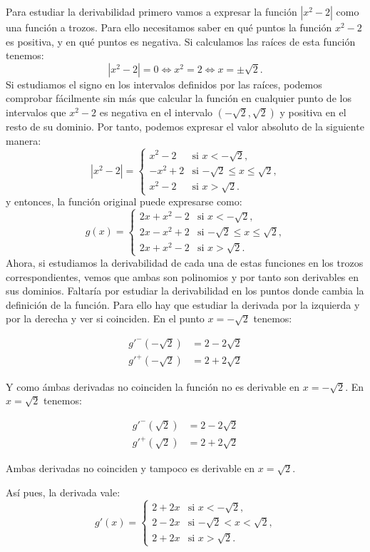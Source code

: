 {Para estudiar la derivabilidad primero vamos a expresar la función $|x^2-2|$ como una función a trozos. Para ello necesitamos saber en qué puntos la función $x^2-2$ es positiva, y en qué puntos es negativa. Si calculamos las raíces de esta función tenemos:
\[
|x^2-2| = 0 \Leftrightarrow x^2 = 2 \Leftrightarrow x = \pm \sqrt 2.
\]
Si estudiamos el signo en los intervalos definidos por las raíces, podemos comprobar fácilmente sin más que calcular la función en cualquier punto de los intervalos que $x^2-2$ es negativa en el intervalo $(-\sqrt 2, \sqrt 2)$ y positiva en el resto de su dominio.
Por tanto, podemos expresar el valor absoluto de la siguiente manera:
\[
|x^2-2| =
\begin{cases}
x^2-2 & \mbox{si $x< -\sqrt{2}$,} \\
-x^2+2 & \mbox{si $-\sqrt 2 \leq x \leq \sqrt 2$,}\\
x^2-2 & \mbox{si $x > \sqrt 2$.}
\end{cases}
\]
y entonces, la función original puede expresarse como:
\[
g(x) =
\begin{cases}
2x+x^2-2 & \mbox{si $x< -\sqrt{2}$,} \\
2x-x^2+2 & \mbox{si $-\sqrt 2 \leq x \leq \sqrt 2$,}\\
2x+x^2-2 & \mbox{si $x > \sqrt 2$.}
\end{cases}
\]
Ahora, si estudiamos la derivabilidad de cada una de estas funciones en los trozos correspondientes, vemos que ambas son polinomios y por tanto son derivables en sus dominios. Faltaría por estudiar la derivabilidad en los puntos donde cambia la definición de la función. Para ello hay que estudiar la derivada por la izquierda y por la derecha y ver si coinciden. En el punto $x=-\sqrt 2$ tenemos:

\begin{align*}
g'^-(-\sqrt{2}) &= 2-2\sqrt 2\\
g'^+(-\sqrt{2}) &= 2+2\sqrt 2
\end{align*}

Y como ámbas derivadas no coinciden la función no es derivable en $x=-\sqrt 2$. En $x=\sqrt 2 $ tenemos:

\begin{align*}
g'^-(\sqrt{2}) &= 2-2\sqrt 2\\
g'^+(\sqrt{2}) &= 2+2\sqrt 2
\end{align*}

Ambas derivadas no coinciden y tampoco es derivable en $x=\sqrt 2$.

Así pues, la derivada vale:
\[
g'(x)=
\begin{cases}
2+2x & \mbox{si $x< -\sqrt{2}$,} \\
2-2x & \mbox{si $-\sqrt 2 < x < \sqrt 2$,}\\
2+2x & \mbox{si $x > \sqrt 2$.}
\end{cases}
\]
}


